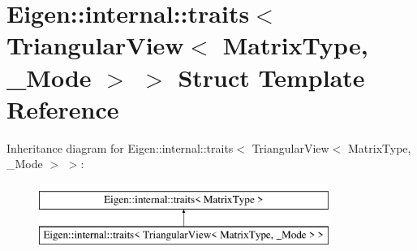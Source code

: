 \hypertarget{struct_eigen_1_1internal_1_1traits_3_01_triangular_view_3_01_matrix_type_00_01___mode_01_4_01_4}{}\section{Eigen\+::internal\+::traits$<$ Triangular\+View$<$ Matrix\+Type, \+\_\+\+Mode $>$ $>$ Struct Template Reference}
\label{struct_eigen_1_1internal_1_1traits_3_01_triangular_view_3_01_matrix_type_00_01___mode_01_4_01_4}
Inheritance diagram for Eigen\+::internal\+::traits$<$ Triangular\+View$<$ Matrix\+Type, \+\_\+\+Mode $>$ $>$\+:\begin{figure}[H]
\begin{center}
\leavevmode
\includegraphics[height=2.000000cm]{struct_eigen_1_1internal_1_1traits_3_01_triangular_view_3_01_matrix_type_00_01___mode_01_4_01_4}
\end{center}
\end{figure}

